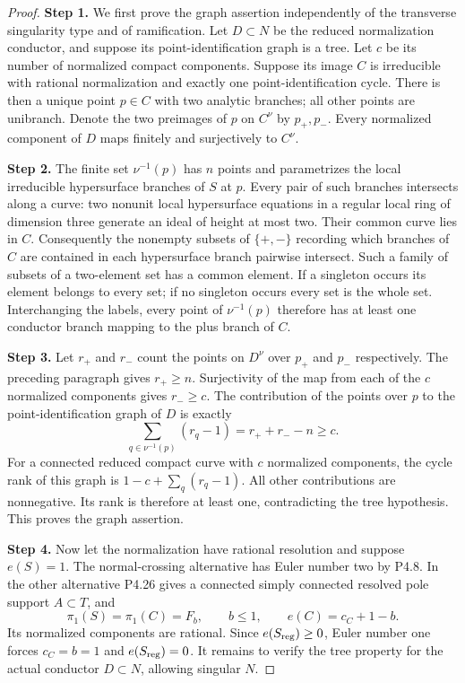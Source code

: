 \begin{proof}
\noindent\textbf{Step 1.} We first prove the graph assertion independently of
the transverse singularity type and of ramification.
Let $D\subset N$ be the reduced normalization conductor,
and suppose its point-identification graph is a tree.
Let $c$ be its number of normalized compact components.
Suppose its image $C$ is irreducible with rational
normalization and exactly one point-identification
cycle. There is then a unique point $p\in C$ with
two analytic branches; all other points are unibranch.
Denote the two preimages of $p$ on $C^\nu$ by
$p_+,p_-$. Every normalized component of $D$ maps
finitely and surjectively to $C^\nu$.

\noindent\textbf{Step 2.} The finite set $\nu^{-1}(p)$ has $n$ points and
parametrizes the local irreducible hypersurface
branches of $S$ at $p$. Every pair of such branches
intersects along a curve: two nonunit local
hypersurface equations in a regular local ring of
dimension three generate an ideal of height at most
two. Their common curve lies in $C$. Consequently
the nonempty subsets of $\{+,-\}$ recording which
branches of $C$ are contained in each hypersurface
branch pairwise intersect. Such a family of subsets
of a two-element set has a common element. If a
singleton occurs its element belongs to every set;
if no singleton occurs every set is the whole set.
Interchanging the labels, every point of
$\nu^{-1}(p)$ therefore has at least one conductor
branch mapping to the plus branch of $C$.

\noindent\textbf{Step 3.} Let $r_+$ and $r_-$ count the points on $D^\nu$
over $p_+$ and $p_-$ respectively. The preceding
paragraph gives $r_+\ge n$. Surjectivity of the
map from each of the $c$ normalized components
gives $r_-\ge c$. The contribution of the points
over $p$ to the point-identification graph of $D$
is exactly
\[
 \sum_{q\in\nu^{-1}(p)}(r_q-1)
       =r_++r_--n\ge c.
\]
For a connected reduced compact curve with $c$
normalized components, the cycle rank of this graph
is $1-c+\sum_q(r_q-1)$. All other contributions
are nonnegative. Its rank is therefore at least
one, contradicting the tree hypothesis.
This proves the graph assertion.

\noindent\textbf{Step 4.} Now let the normalization have rational resolution
and suppose $e(S)=1$. The normal-crossing alternative
has Euler number two by P4.8. In the other alternative
P4.26 gives a connected simply connected resolved
pole support $A\subset T$, and
\[
 \pi_1(S)=\pi_1(C)=F_b,\qquad b\le1,
 \qquad e(C)=c_C+1-b.
\]
Its normalized components are rational.
Since $e(S_{\rm reg})\ge0$, Euler number one forces
$c_C=b=1$ and $e(S_{\rm reg})=0$.
It remains to verify the tree property for the
actual conductor $D\subset N$, allowing singular $N$.


\end{proof}
